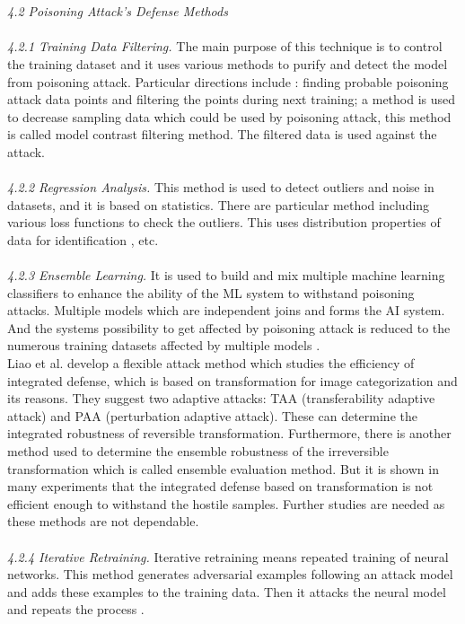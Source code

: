 \documentclass{article}
\begin{document}
\\\\
\textit{4.2 Poisoning Attack’s Defense Methods}
\\\\
\textit{4.2.1 Training Data Filtering.}
The main purpose of this technique is to control the training dataset and it uses various methods to purify and detect the model from poisoning attack. Particular directions include \cite{laishram2016curie}: finding probable poisoning attack data points and filtering the points during next training; a method is used to decrease sampling data which could be used by poisoning attack, this method is called model contrast filtering method. The filtered data is used against the attack.
\\\\
\textit{4.2.2 Regression Analysis.}
This method is used to detect outliers and noise in datasets, and it is based on statistics. There are particular method including various loss functions to check the outliers. This uses distribution properties of data for identification \cite{jagielski2018manipulating}, etc. 
\\\\
\textit{4.2.3 Ensemble Learning.}
It is used to build and mix multiple machine learning classifiers to enhance the ability of the ML system to withstand poisoning attacks. Multiple models which are independent joins and forms the AI system. And the systems possibility to get affected by poisoning attack is reduced to the numerous training datasets affected by multiple models \cite{li2020adversarial}.
\\
Liao et al. \cite{liao2020does} develop a flexible attack method which studies the efficiency of integrated defense, which is based on transformation for image categorization and its reasons. They suggest two adaptive attacks: TAA (transferability adaptive attack) and PAA (perturbation adaptive attack). These can determine the integrated robustness of reversible transformation. Furthermore, there is another method used to determine the ensemble robustness of the irreversible transformation which is called ensemble evaluation method. But it is shown in many experiments that the integrated defense based on transformation is not efficient enough to withstand the hostile samples. Further studies are needed as these methods are not dependable.
\\\\
\textit{4.2.4 Iterative Retraining.}
Iterative retraining means repeated training of neural networks. This method generates adversarial examples following an attack model and adds these examples to the training data. Then it attacks the neural model and repeats the process \cite{kim2021zero}.
\end{document}
